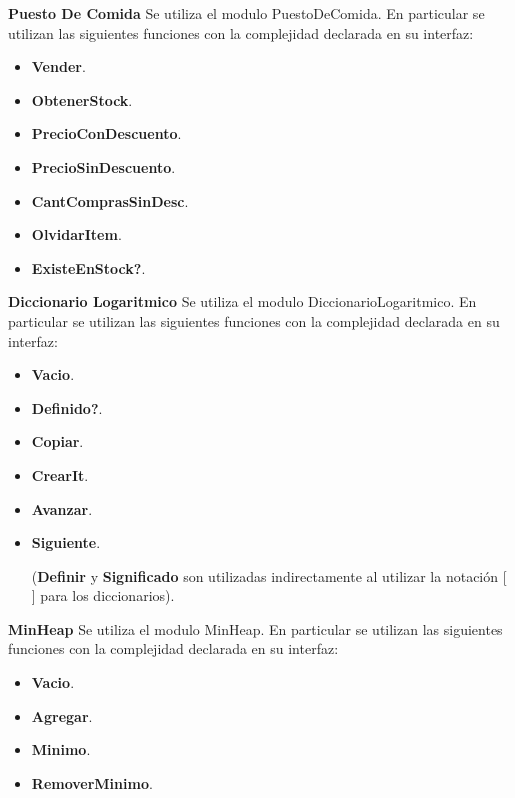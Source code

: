 \documentclass[../main.tex]{subfiles}
\begin{document}
\begin{servicios}
    {\large\bfseries Puesto De Comida}
    Se utiliza el modulo PuestoDeComida. En particular se utilizan las siguientes funciones con la complejidad declarada en su interfaz:\par
    \begin{itemize}
        \item \textbf{Vender}.
        \item \textbf{ObtenerStock}.
        \item \textbf{PrecioConDescuento}.
        \item \textbf{PrecioSinDescuento}.
        \item \textbf{CantComprasSinDesc}.
        \item \textbf{OlvidarItem}.
        \item \textbf{ExisteEnStock?}.
    \end{itemize}
    
    {\nln\large\bfseries Diccionario Logaritmico \nln}
    Se utiliza el modulo DiccionarioLogaritmico. En particular se utilizan las siguientes funciones con la complejidad declarada en su interfaz:\par
    \begin{itemize}
        \item \textbf{Vacio}.
        \item \textbf{Definido?}.
        \item \textbf{Copiar}.
        \item \textbf{CrearIt}.
        \item \textbf{Avanzar}.
        \item \textbf{Siguiente}.

        (\textbf{Definir} y \textbf{Significado} son utilizadas indirectamente al utilizar la notación [ ] para los diccionarios).
    \end{itemize}
    
    \clearpage
    
    {\nln\large\bfseries MinHeap \nln}
    Se utiliza el modulo MinHeap. En particular se utilizan las siguientes funciones con la complejidad declarada en su interfaz:\par
    \begin{itemize}
        \item  \textbf{Vacio}.
        \item  \textbf{Agregar}.
         \item \textbf{Minimo}.
         \item \textbf{RemoverMinimo}.
        

\end{itemize}
\end{servicios}
\end{document}
